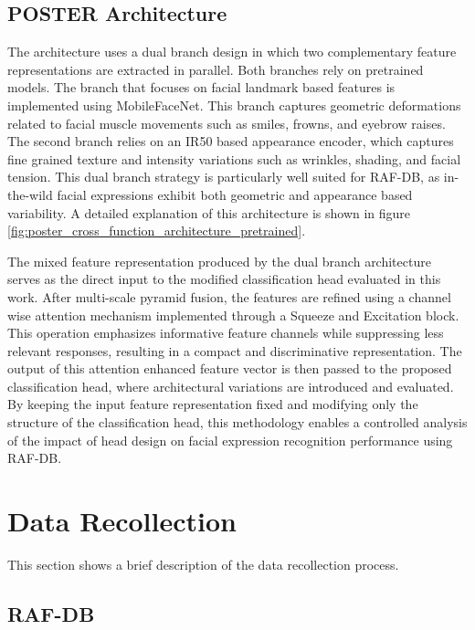 \subsection{\gls{POSTER} Architecture}

The architecture uses a dual branch design in which two complementary feature representations are extracted in parallel. Both branches rely on pretrained models. The branch that focuses on facial landmark based features is implemented using MobileFaceNet. This branch captures geometric deformations related to facial muscle movements such as smiles, frowns, and eyebrow raises. The second branch relies on an IR50 based appearance encoder, which captures fine grained texture and intensity variations such as wrinkles, shading, and facial tension. This dual branch strategy is particularly well suited for RAF-DB, as \gls{in-the-wild} facial expressions exhibit both geometric and appearance based variability. A detailed explanation of this architecture is shown in figure \ref{fig:poster_cross_function_architecture_pretrained}.


The mixed feature representation produced by the dual branch architecture serves as the direct input to the modified classification head evaluated in this work. After multi-scale pyramid fusion, the features are refined using a channel wise attention mechanism implemented through a Squeeze and Excitation block. This operation emphasizes informative feature channels while suppressing less relevant responses, resulting in a compact and discriminative representation. The output of this attention enhanced feature vector is then passed to the proposed classification head, where architectural variations are introduced and evaluated. By keeping the input feature representation fixed and modifying only the structure of the classification head, this methodology enables a controlled analysis of the impact of head design on facial expression recognition performance using RAF-DB.


\section{Data Recollection}

This section shows a brief description of the data recollection process. 


\subsection{RAF-DB}

